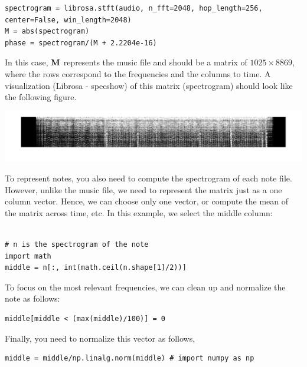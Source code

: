 \begin{lstlisting}
spectrogram = librosa.stft(audio, n_fft=2048, hop_length=256, center=False, win_length=2048)
M = abs(spectrogram)
phase = spectrogram/(M + 2.2204e-16)
\end{lstlisting}

In this case, ${\bf M}$ represents the music file and should be a matrix of $1025 \times 8869$, where the rows correspond to the frequencies and the columns to time. A visualization (Librosa - specshow) of this matrix (spectrogram) should look like the following figure.
\begin{center}
\includegraphics[trim={3cm 0 0 0},clip,scale=0.32]{figs/spectrogram.jpg}
\end{center}
To represent notes, you also need to compute the spectrogram of each note file. However, unlike the music file, we need to represent the matrix just as a one column vector. Hence, we can choose only one vector, or compute the mean of the matrix across time, etc. In this example, we select the middle column:
\begin{lstlisting}

# n is the spectrogram of the note 
import math
middle = n[:, int(math.ceil(n.shape[1]/2))]

\end{lstlisting}
To focus on the most relevant frequencies, we can clean up and normalize the note as follows:
\begin{lstlisting}
middle[middle < (max(middle)/100)] = 0
\end{lstlisting}

\newpage

Finally, you need to normalize this vector as follows,
\begin{lstlisting}
middle = middle/np.linalg.norm(middle) # import numpy as np  
\end{lstlisting}


